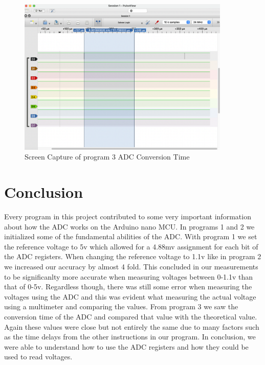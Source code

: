 \documentclass[11pt,pdftex,portrait,letterpaper]{article}
\begin{document}
	\begin{figure}[h]
		\centering
		\includegraphics[width=0.9\textwidth]{./program3_conversionTime}	%
		\caption{Screen Capture of program 3 ADC Conversion Time}
		\label{f:fig1}	%
	\end{figure}
	\pagebreak
	
	
	\section{Conclusion}
	
Every program in this project contributed to some very important information about how the ADC works on the Arduino nano MCU. In programs 1 and 2 we initialized some of the fundamental abilities of the ADC. With program 1 we set the reference voltage to 5v which allowed for a 4.88mv assignment for each bit of the ADC registers. When changing the reference voltage to 1.1v like in program 2 we increased our accuracy by almost 4 fold. This concluded in our measurements to be significanlty more accurate when measuring voltages between 0-1.1v than that of 0-5v. Regardless though, there was still some error when measuring the voltages using the ADC and this was evident what measuring the actual voltage using a multimeter and comparing the values. From program 3 we saw the conversion time of the ADC and compared that value with the theoretical value. Again these values were close but not entirely the same due to many factors such as the time delays from the other instructions in our program. In conclusion, we were able to understand how to use the ADC registers and how they could be used to read voltages.
	
\end{document}
